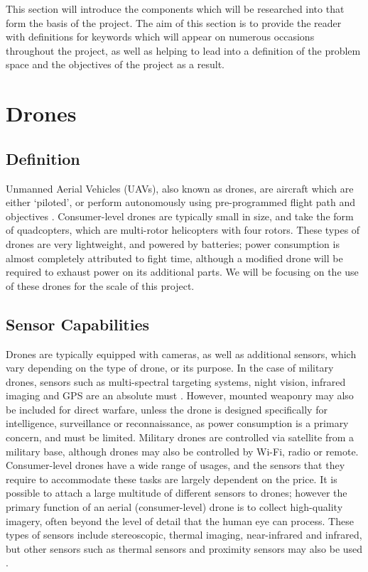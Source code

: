 This section will introduce the components which will be researched into that form the basis of the project. The aim of this section is to provide the reader with definitions for keywords which will appear on numerous occasions throughout the project, as well as helping to lead into a definition of the problem space and the objectives of the project as a result. 
	\section{Drones}
		\subsection{Definition}
		Unmanned Aerial Vehicles (UAVs), also known as drones, are aircraft which are either ‘piloted’, or perform autonomously using pre-programmed flight path and objectives \cite{chriscolejimwright2010}. Consumer-level drones are typically small in size, and take the form of quadcopters, which are multi-rotor helicopters with four rotors.  These types of drones are very lightweight, and powered by batteries; power consumption is almost completely attributed to fight time, although a modified drone will be required to exhaust power on its additional parts. We will be focusing on the use of these drones for the scale of this project.
		\subsection{Sensor Capabilities}
		Drones are typically equipped with cameras, as well as additional sensors, which vary depending on the type of drone, or its purpose. In the case of military drones, sensors such as multi-spectral targeting systems, night vision, infrared imaging and GPS are an absolute must \cite{usairforce2015}. However, mounted weaponry may also be included for direct warfare, unless the drone is designed specifically for intelligence, surveillance or reconnaissance, as power consumption is a primary concern, and must be limited. Military drones are controlled via satellite from a military base, although drones may also be controlled by Wi-Fi, radio or remote. Consumer-level drones have a wide range of usages, and the sensors that they require to accommodate these tasks are largely dependent on the price. It is possible to attach a large multitude of different sensors to drones; however the primary function of an aerial (consumer-level) drone is to collect high-quality imagery, often beyond the level of detail that the human eye can process.  These types of sensors include stereoscopic, thermal imaging, near-infrared and infrared, but other sensors such as thermal sensors and proximity sensors may also be used \cite{ questuav2015}.
